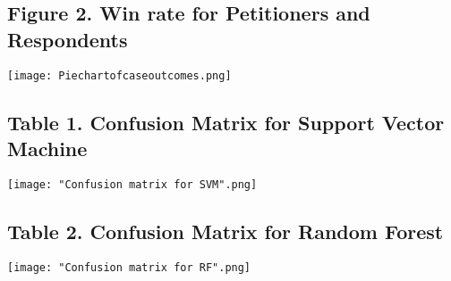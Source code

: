 \documentclass[12pt,english]{article}
\begin{document}
\subsection{Figure 2. Win rate for Petitioners and Respondents}
\begin{center}
\texttt{[image: Piechartofcaseoutcomes.png]}
\end{center}
\subsection{Table 1. Confusion Matrix for Support Vector Machine}
\begin{center}
\texttt{[image: "Confusion matrix for SVM".png]}
\end{center}
\subsection{Table 2. Confusion Matrix for Random Forest}
\begin{center}
\texttt{[image: "Confusion matrix for RF".png]}
\end{center}
\end{document}
